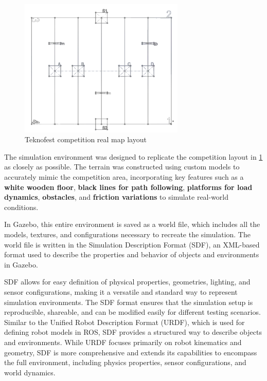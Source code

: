 \documentclass[../../main]{subfiles}
\begin{document}
\begin{figure}[H]
  \centering
\includegraphics[width=0.7\textwidth]{fig/competition_area_layout_teknofest.png}
\caption{Teknofest competition real map layout}
\label{Teknofest competition real map layout} %
\end{figure}


The simulation environment was designed to replicate the competition layout in \cref{Teknofest competition real map layout} as closely as possible. 
The terrain was constructed using custom models to accurately mimic the competition area, incorporating key features such as a 
\textbf{white wooden floor}, \textbf{black lines for path following}, \textbf{platforms for load dynamics}, 
\textbf{obstacles}, and \textbf{friction variations} to simulate real-world conditions. 

In Gazebo, this entire environment is saved as a world file, which includes all the models, textures, 
and configurations necessary to recreate the simulation. The world file is written in the Simulation Description Format (SDF), 
an XML-based format used to describe the properties and behavior of objects and environments in Gazebo. 

SDF allows for easy definition of physical properties, geometries, lighting, and sensor configurations, making it a versatile 
and standard way to represent simulation environments. The SDF format ensures that the simulation setup is reproducible, 
shareable, and can be modified easily for different testing scenarios. Similar to the Unified Robot Description Format (URDF), 
which is used for defining robot models in ROS, SDF provides a structured way to describe objects and environments. 
While URDF focuses primarily on robot kinematics and geometry, SDF is more comprehensive and extends its capabilities 
to encompass the full environment, including physics properties, sensor configurations, and world dynamics.
\end{document}
